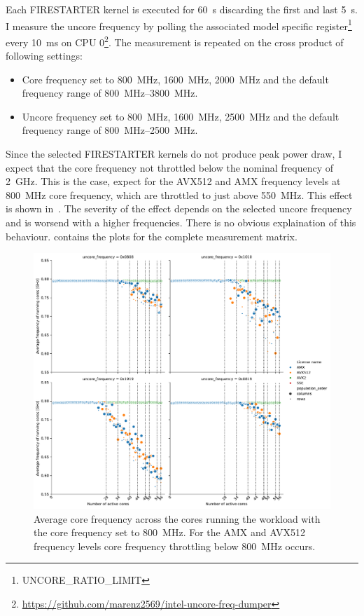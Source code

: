 Each FIRESTARTER kernel is executed for \SI{60}{\s} discarding the first and last \SI{5}{\s}.
I measure the uncore frequency by polling the associated model specific register\footnote{UNCORE\_RATIO\_LIMIT} every \SI{10}{\ms} on CPU 0\footnote{\url{https://github.com/marenz2569/intel-uncore-freq-dumper}}.
The measurement is repeated on the cross product of following settings:
\begin{itemize}
    \item Core frequency set to \SI{800}{\MHz}, \SI{1600}{\MHz}, \SI{2000}{\MHz} and the default frequency range of \SI{800}{\MHz}--\SI{3800}{\MHz}.
    \item Uncore frequency set to \SI{800}{\MHz}, \SI{1600}{\MHz}, \SI{2500}{\MHz} and the default frequency range of \SI{800}{\MHz}--\SI{2500}{\MHz}.
\end{itemize}

Since the selected FIRESTARTER kernels do not produce peak power draw, I expect that the core frequency not throttled below the nominal frequency of \SI{2}{\GHz}.
This is the case, expect for the AVX512 and AMX frequency levels at \SI{800}{\MHz} core frequency, which are throttled to just above \SI{550}{\MHz}.
This effect is shown in~.
The severity of the effect depends on the selected uncore frequency and is worsend with a higher frequencies.
There is no obvious explaination of this behaviour.
 contains the plots for the complete measurement matrix.

\begin{figure}[]
    \centering
    \includegraphics[width=0.8\columnwidth]{fig/avx-frequency-license-bands-without-isst-core-frequency-800.pdf}
    \caption{\label{fig:avx-anomalies-low-freq}Average core frequency across the cores running the workload with the core frequency set to \SI{800}{\MHz}. For the AMX and AVX512 frequency levels core frequency throttling below \SI{800}{\MHz} occurs.}
\end{figure}

